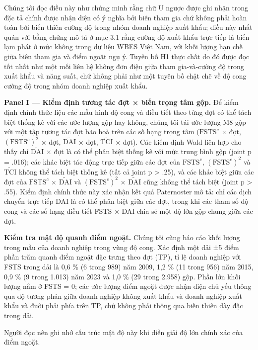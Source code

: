 \documentclass[12pt,a4paper]{article}
\begin{document}
Chúng tôi đọc điều này như chứng minh rằng chữ U ngược được ghi nhận
trong đặc tả chính được nhận diện có ý nghĩa bởi biên tham gia chứ không
phải hoàn toàn bởi biến thiên cường độ trong nhóm doanh nghiệp xuất
khẩu; điều này nhất quán với bằng chứng mô tả ở mục 3.1 rằng cường độ
xuất khẩu trực tiếp là biến lạm phát ở mức không trong dữ liệu WBES Việt
Nam, với khối lượng hạn chế giữa biên tham gia và điểm ngoặt ngụ ý.
Tuyên bố H1 thực chất do đó được đọc tốt nhất như một mối liên hệ không
đơn điệu giữa tham gia-và-cường độ trong xuất khẩu và năng suất, chứ
không phải như một tuyên bố chặt chẽ về độ cong cường độ trong nhóm
doanh nghiệp xuất khẩu.

\textbf{Panel I --- Kiểm định tương tác đợt × biến trọng tâm gộp.} Để
kiểm định chính thức liệu các mẫu hình độ cong và điều tiết theo từng
đợt có thể tách biệt thống kê với các ước lượng gộp hay không, chúng tôi
tái ước lượng M8 gộp với một tập tương tác đợt bão hoà trên các số hạng
trọng tâm (\(\mathrm{FSTS}^{c}\) × đợt, \((\mathrm{FSTS}^{c})^2\) × đợt,
\(\tilde{\mathrm{DAI}}\) × đợt, \(\tilde{\mathrm{TCI}}\) × đợt). Các
kiểm định Wald liên hợp cho thấy chỉ \(\tilde{\mathrm{DAI}}\) × đợt là
có thể phân biệt thống kê với mức trung bình gộp (joint p = .016); các
khác biệt tác động trực tiếp giữa các đợt của \(\mathrm{FSTS}^{c}\),
\((\mathrm{FSTS}^{c})^2\) và \(\tilde{\mathrm{TCI}}\) không thể tách
biệt thống kê (tất cả joint p \textgreater{} .25), và các khác biệt giữa
các đợt của \(\mathrm{FSTS}^{c}\) × \(\tilde{\mathrm{DAI}}\) và
\((\mathrm{FSTS}^{c})^2\) × \(\tilde{\mathrm{DAI}}\) cũng không thể tách
biệt (joint p \textgreater{} .55). Kiểm định chính thức này xác nhận kết
quả Paternoster mô tả: chỉ các dịch chuyển trực tiếp DAI là có thể phân
biệt giữa các đợt, trong khi các tham số độ cong và các số hạng điều
tiết FSTS × DAI chia sẻ một độ lớn gộp chung giữa các đợt.

\textbf{Kiểm tra mật độ quanh điểm ngoặt.} Chúng tôi cũng báo cáo khối
lượng trong mẫu của doanh nghiệp trong vùng độ cong. Xác định một dải ±5
điểm phần trăm quanh điểm ngoặt đặc trưng theo đợt (TP), tỉ lệ doanh
nghiệp với FSTS trong dải là 0,6 \% (6 trong 989) năm 2009, 1,2 \% (11
trong 956) năm 2015, 0,9 \% (9 trong 1.013) năm 2023 và 1,0 \% (29 trong
2.958) gộp. Phần lớn khối lượng nằm ở FSTS = 0; các ước lượng điểm ngoặt
được nhận diện chủ yếu thông qua độ tương phản giữa doanh nghiệp không
xuất khẩu và doanh nghiệp xuất khẩu và đuôi phải phía trên TP, chứ không
phải thông qua biến thiên dày đặc trong dải.

Người đọc nên ghi nhớ cấu trúc mật độ này khi diễn giải độ lớn chính xác
của điểm ngoặt.
\end{document}
